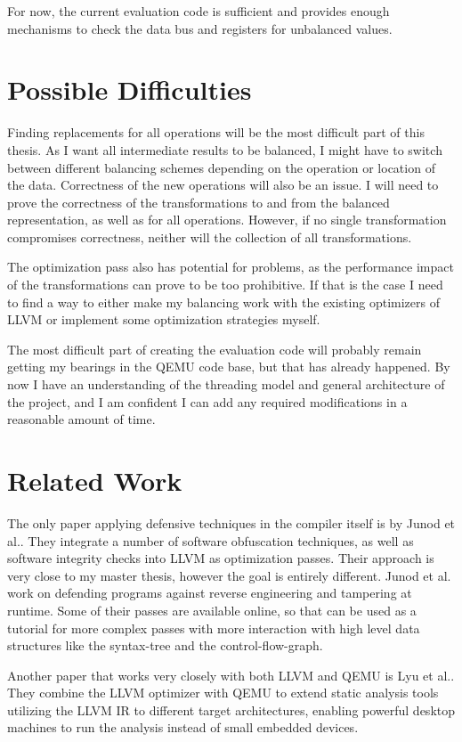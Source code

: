 \documentclass{article}
\newcommand{\qemu}{QEMU}
\newcommand{\llvm}{LLVM}
\begin{document}
For now, the current evaluation code is sufficient and provides enough mechanisms to check the data bus and registers for unbalanced values.

\section{Possible Difficulties}
\label{sec:difficulties}
Finding replacements for all operations will be the most difficult part of this thesis.
As I want all intermediate results to be balanced, I might have to switch between different balancing schemes depending on the operation or location of the data.
Correctness of the new operations will also be an issue.
I will need to prove the correctness of the transformations to and from the balanced representation, as well as for all operations.
However, if no single transformation compromises correctness, neither will the collection of all transformations.

The optimization pass also has potential for problems, as the performance impact of the transformations can prove to be too prohibitive.
If that is the case I need to find a way to either make my balancing work with the existing optimizers of \llvm{} or implement some optimization strategies myself.

The most difficult part of creating the evaluation code will probably remain getting my bearings in the \qemu{} code base, but that has already happened.
By now I have an understanding of the threading model and general architecture of the project, and I am confident I can add any required modifications in a reasonable amount of time.

\section{Related Work}
\label{sec:related-work}
The only paper applying defensive techniques in the compiler itself is by Junod et al.\cite{junod2015obfuscator}.
They integrate a number of software obfuscation techniques, as well as software integrity checks into \llvm{} as optimization passes.
Their approach is very close to my master thesis, however the goal is entirely different.
Junod et al. work on defending programs against reverse engineering and tampering at runtime.
Some of their passes are available online, so that can be used as a tutorial for more complex passes with more interaction with high level data structures like the syntax-tree and the control-flow-graph.

Another paper that works very closely with both \llvm{} and \qemu{} is Lyu et al.\cite{lyu2014dbill}.
They combine the \llvm{} optimizer with \qemu{} to extend static analysis tools utilizing the \llvm{} IR to different target architectures, enabling powerful desktop machines to run the analysis instead of small embedded devices.
\end{document}
